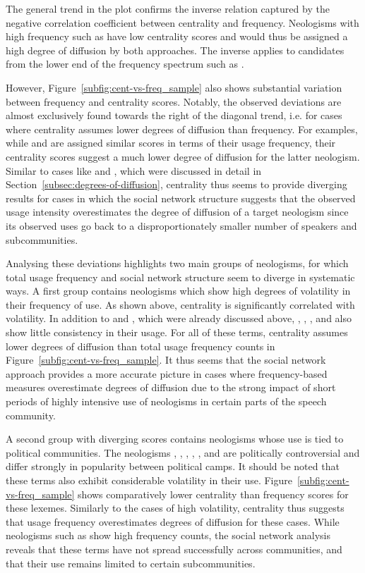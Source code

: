 \documentclass[
  a4paper,
  abstract=on,
  captions=tableabove
  ]{scrartcl}
\begin{document}
      The general trend in the plot confirms the inverse relation captured by the negative correlation coefficient between centrality and frequency. Neologisms with high frequency such as  have low centrality scores and would thus be assigned a high degree of diffusion by both approaches. The inverse applies to candidates from the lower end of the frequency spectrum such as .

      However, Figure~\ref{subfig:cent-vs-freq_sample} also shows substantial variation between frequency and centrality scores. Notably, the observed deviations are almost exclusively found towards the right of the diagonal trend, i.e. for cases where centrality assumes lower degrees of diffusion than frequency. For examples, while  and  are assigned similar scores in terms of their usage frequency, their centrality scores suggest a much lower degree of diffusion for the latter neologism. Similar to cases like  and , which were discussed in detail in Section~\ref{subsec:degrees-of-diffusion}, centrality thus seems to provide diverging results for cases in which the social network structure suggests that the observed usage intensity overestimates the degree of diffusion of a target neologism since its observed uses go back to a disproportionately smaller number of speakers and subcommunities.

      Analysing these deviations highlights two main groups of neologisms, for which total usage frequency and social network structure seem to diverge in systematic ways. A first group contains neologisms which show high degrees of volatility in their frequency of use. As shown above, centrality is significantly correlated with volatility. In addition to  and , which were already discussed above, , , , and  also show little consistency in their usage. For all of these terms, centrality assumes lower degrees of diffusion than total usage frequency counts in Figure~\ref{subfig:cent-vs-freq_sample}. It thus seems that the social network approach provides a more accurate picture in cases where frequency-based measures overestimate degrees of diffusion due to the strong impact of short periods of highly intensive use of neologisms in certain parts of the speech community.

      A second group with diverging scores contains neologisms whose use is tied to political communities. The neologisms , , , , , and  are politically controversial and differ strongly in popularity between political camps. It should be noted that these terms also exhibit considerable volatility in their use. Figure~\ref{subfig:cent-vs-freq_sample} shows comparatively lower centrality than frequency scores for these lexemes. Similarly to the cases of high volatility, centrality thus suggests that usage frequency overestimates degrees of diffusion for these cases. While neologisms such as  show high frequency counts, the social network analysis reveals that these terms have not spread successfully across communities, and that their use remains limited to certain subcommunities.
\end{document}
